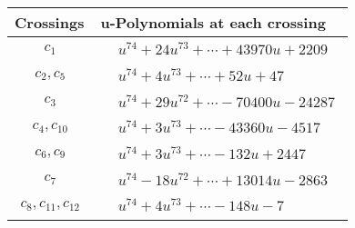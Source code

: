 \documentclass[1p]{elsarticle_modified}
\theoremstyle{definition}
\begin{document}
\begin{tabular}{m{50pt}|m{274pt}}
Crossings & \hspace{64pt}u-Polynomials at each crossing \\
\hline $$\begin{aligned}c_{1}\end{aligned}$$&$\begin{aligned}
&u^{74}+24 u^{73}+\cdots+43970 u+2209
\end{aligned}$\\
\hline $$\begin{aligned}c_{2},c_{5}\end{aligned}$$&$\begin{aligned}
&u^{74}+4 u^{73}+\cdots+52 u+47
\end{aligned}$\\
\hline $$\begin{aligned}c_{3}\end{aligned}$$&$\begin{aligned}
&u^{74}+29 u^{72}+\cdots-70400 u-24287
\end{aligned}$\\
\hline $$\begin{aligned}c_{4},c_{10}\end{aligned}$$&$\begin{aligned}
&u^{74}+3 u^{73}+\cdots-43360 u-4517
\end{aligned}$\\
\hline $$\begin{aligned}c_{6},c_{9}\end{aligned}$$&$\begin{aligned}
&u^{74}+3 u^{73}+\cdots-132 u+2447
\end{aligned}$\\
\hline $$\begin{aligned}c_{7}\end{aligned}$$&$\begin{aligned}
&u^{74}-18 u^{72}+\cdots+13014 u-2863
\end{aligned}$\\
\hline $$\begin{aligned}c_{8},c_{11},c_{12}\end{aligned}$$&$\begin{aligned}
&u^{74}+4 u^{73}+\cdots-148 u-7
\end{aligned}$\\
\hline
\end{tabular}\\~\\
\newpage\renewcommand{\arraystretch}{1}
\end{document}
